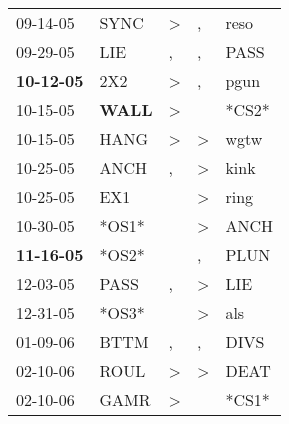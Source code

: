 \begin{supertabular}{p{0.07\textwidth}p{0.06\textwidth}p{0.02\textwidth}p{0.02\textwidth}p{0.06\textwidth}}
          09-14-05\textsuperscript{} &           SYNC\textsuperscript{} &     \textgreater &                , &           reso\textsuperscript{} \\
          09-29-05\textsuperscript{} &            LIE\textsuperscript{} &                , &                , &           PASS\textsuperscript{} \\
 \textbf{10-12-05\textsuperscript{}} &            2X2\textsuperscript{} &     \textgreater &                , &           pgun\textsuperscript{} \\
          10-15-05\textsuperscript{} &  \textbf{WALL\textsuperscript{}} &     \textgreater &                  &                            *CS2* \\
          10-15-05\textsuperscript{} &           HANG\textsuperscript{} &     \textgreater &     \textgreater &           wgtw\textsuperscript{} \\
          10-25-05\textsuperscript{} &           ANCH\textsuperscript{} &                , &     \textgreater &           kink\textsuperscript{} \\
          10-25-05\textsuperscript{} &            EX1\textsuperscript{} &                  &     \textgreater &           ring\textsuperscript{} \\
          10-30-05\textsuperscript{} &                            *OS1* &                  &     \textgreater &           ANCH\textsuperscript{} \\
 \textbf{11-16-05\textsuperscript{}} &                            *OS2* &                  &                , &           PLUN\textsuperscript{} \\
          12-03-05\textsuperscript{} &           PASS\textsuperscript{} &                , &     \textgreater &            LIE\textsuperscript{} \\
          12-31-05\textsuperscript{} &                            *OS3* &                  &     \textgreater &            als\textsuperscript{} \\
          01-09-06\textsuperscript{} &           BTTM\textsuperscript{} &                , &                , &           DIVS\textsuperscript{} \\
          02-10-06\textsuperscript{} &           ROUL\textsuperscript{} &     \textgreater &     \textgreater &           DEAT\textsuperscript{} \\
          02-10-06\textsuperscript{} &           GAMR\textsuperscript{} &     \textgreater &                  &                            *CS1* \\

\end{supertabular}
